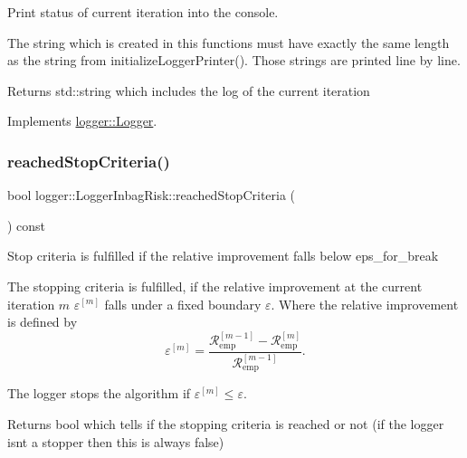 Print status of current iteration into the console. 

The string which is created in this functions must have exactly the same length as the string from {\ttfamily initialize\+Logger\+Printer()}. Those strings are printed line by line.

\begin{DoxyReturn}{Returns}
{\ttfamily std\+::string} which includes the log of the current iteration 
\end{DoxyReturn}


Implements \hyperlink{classlogger_1_1_logger_abad818a7e8053ca84cb267e883b5e377}{logger\+::\+Logger}.

\mbox{\label{classlogger_1_1_logger_inbag_risk_a48453cfb5a3bbe3b1a73bbcb2d40f49e}} 
\subsubsection{\texorpdfstring{reached\+Stop\+Criteria()}{reachedStopCriteria()}}
{\footnotesize\ttfamily bool logger\+::\+Logger\+Inbag\+Risk\+::reached\+Stop\+Criteria (\begin{DoxyParamCaption}{ }\end{DoxyParamCaption}) const\hspace{0.3cm}{\ttfamily [virtual]}}



Stop criteria is fulfilled if the relative improvement falls below {\ttfamily eps\+\_\+for\+\_\+break} 

The stopping criteria is fulfilled, if the relative improvement at the current iteration $m$ $\varepsilon^{[m]}$ falls under a fixed boundary $\varepsilon$. Where the relative improvement is defined by \[ \varepsilon^{[m]} = \frac{\mathcal{R}_\mathrm{emp}^{[m-1]} - \mathcal{R}_\mathrm{emp}^{[m]}}{\mathcal{R}_\mathrm{emp}^{[m-1]}}. \]

The logger stops the algorithm if $\varepsilon^{[m]} \leq \varepsilon$.

\begin{DoxyReturn}{Returns}
{\ttfamily bool} which tells if the stopping criteria is reached or not (if the logger isn\textquotesingle{}t a stopper then this is always false) 
\end{DoxyReturn}


